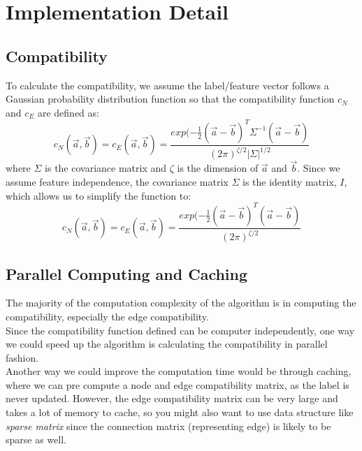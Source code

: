 \section{Implementation Detail}

\subsection{Compatibility}
\label{ssec:compatibility}

To calculate the compatibility, we assume the label/feature vector follows a Gaussian probability distribution function so that the compatibility function $c_N$ and $c_E$ are defined as:
\begin{equation} 
c_N( \overrightarrow{a}, \overrightarrow{b} )=c_E( \overrightarrow{a}, \overrightarrow{b})=\frac{exp(-\frac{1}{2}(\overrightarrow{a}-\overrightarrow{b})^{T}\Sigma^{-1}(\overrightarrow{a}-\overrightarrow{b})}{(2\pi)^{\zeta/2}|\Sigma|^{1/2}}
\end{equation}
where $\Sigma$ is the covariance matrix and $\zeta$ is the dimension of $\overrightarrow{a}$ and $\overrightarrow{b}$. Since we assume feature independence, the covariance matrix $\Sigma$ is the identity matrix, $I$, which allows us to simplify the function to:
\begin{equation} 
c_N( \overrightarrow{a}, \overrightarrow{b} )=c_E( \overrightarrow{a}, \overrightarrow{b})=\frac{exp(-\frac{1}{2}(\overrightarrow{a}-\overrightarrow{b})^{T}(\overrightarrow{a}-\overrightarrow{b})}{(2\pi)^{\zeta/2}}
\end{equation}

\subsection{Parallel Computing and Caching}

The majority of the computation complexity of the algorithm is in computing the compatibility, especially the edge compatibility.\\

Since the compatibility function defined can be computer independently, one way we could speed up the algorithm is calculating the compatibility in parallel fashion.\\

Another way we could improve the computation time would be through caching, where we can pre compute a node and edge compatibility matrix, as the label is never updated. However, the edge compatibility matrix can be very large and takes a lot of memory to cache, so you might also want to use data structure like \emph{sparse matrix} since the connection matrix (representing edge) is likely to be sparse as well.

